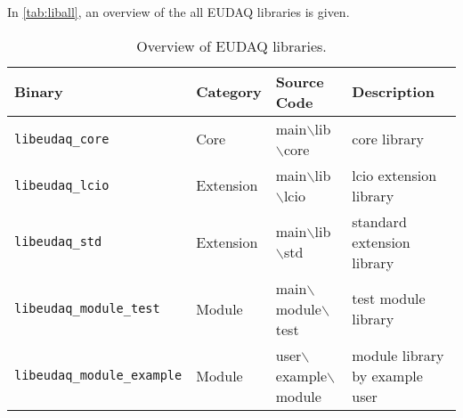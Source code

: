 In \autoref{tab:liball}, an overview of the all EUDAQ libraries is given.\\

\begin{table}
\centering
\small
\begin{tabular}{ l | l | l | p{4cm}}
  \textbf{Binary} & \textbf{Category} & \textbf{Source Code} & \textbf{Description}\\
  \hline
  \hline
  \texttt{libeudaq\_core} & Core & main$\backslash$lib$\backslash$core & core library \\
  \hline
  \texttt{libeudaq\_lcio} & Extension & main$\backslash$lib$\backslash$lcio & lcio extension library \\
  \texttt{libeudaq\_std} & Extension & main$\backslash$lib$\backslash$std & standard extension library \\
  \hline
  \texttt{libeudaq\_module\_test} & Module & main$\backslash$module$\backslash$test & test module library \\
  \texttt{libeudaq\_module\_example} & Module & user$\backslash$example$\backslash$module &  module library by example user\\
\end{tabular}
\caption{Overview of EUDAQ libraries.}
\label{tab:liball}
\end{table}
